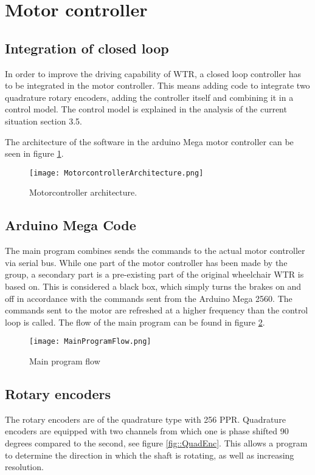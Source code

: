 \section{Motor controller}

\subsection{Integration of closed loop}
In order to improve the driving capability of WTR, a closed loop controller has to be integrated in the motor controller. 
This means adding code to integrate two quadrature rotary encoders, adding the controller itself and combining it in a control model.
The control model is explained in the analysis of the current situation section 3.5.

The architecture of the software in the arduino Mega motor controller can be seen in figure \ref{fig::Motorconarc}.

\begin{figure}[H]
\centering
\texttt{[image: MotorcontrollerArchitecture.png]}
\caption{Motorcontroller architecture.}
\label{fig::Motorconarc}
\end{figure}

\subsection{Arduino Mega Code}
The main program combines sends the commands to the actual motor controller via serial bus. 
While one part of the motor controller has been made by the group, a secondary part is a pre-existing part of the original wheelchair WTR is based on.
This is considered a black box, which simply turns the brakes on and off in accordance with the commands sent from the Arduino Mega 2560.
The commands sent to the motor are refreshed at a higher frequency than the control loop is called. %
The flow of the main program can be found in figure \ref{fig::MPF}.

\begin{figure}[H]
\centering
\texttt{[image: MainProgramFlow.png]}
\caption{Main program flow}
\label{fig::MPF}
\end{figure}


\subsection{Rotary encoders}
The rotary encoders are of the quadrature type with 256 PPR. 
Quadrature encoders are equipped with two channels from which one is phase shifted 90 degrees compared to the second, see figure \ref{fig::QuadEnc}.
This allows a program to determine the direction in which the shaft is rotating, as well as increasing resolution.

